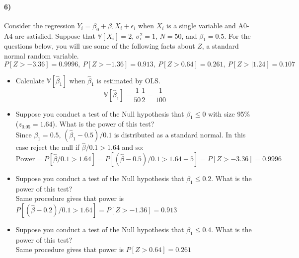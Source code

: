 \documentclass[12pt]{article}
\newcommand\BB{\mathbb}
\newcommand\h{\hat}
\newcommand\eps{\epsilon}
\numberwithin{equation}{section}
\numberwithin{figure}{section}
\numberwithin{table}{section}
\begin{document}
\paragraph{6)} Consider the regression $Y_i = \beta_0 + \beta_1X_i + \eps_i$ when $X_i$ is a single variable and A0-A4 are satisfied. Suppose that $\BB{V}[X_i] = 2$, $\sigma^2_\eps=1$, $N=50$, and $\beta_1 = 0.5$.
For the questions below, you will use some of the following facts about $Z$, a standard normal random variable.
\[P[Z>-3.36] = 0.9996,\ P[Z>-1.36] = 0.913, \ P[Z>0.64] = 0.261,\ P[Z>|1.24] = 0.107 \]
\begin{itemize}
\item Calculate $\BB{V}[\h{\beta}_1]$ when $\h{\beta}_1$ is estimated by OLS.
{\color{blue} \[\BB{V}[\h{\beta}_1] = \frac{1}{50}\frac{1}{2} = \frac{1}{100} \]}
\item Suppose you conduct a test of the Null hypothesis that $\beta_1\leq 0$ with size 95\% ($z_{0.05}=1.64$). What is the power of this test?\\
{\color{blue} Since $\beta_1=0.5$, $(\h{\beta}_1-0.5)/0.1$ is distributed as a standard normal. In this case reject the null if $\hat{\beta}/0.1>1.64$ and so:
\[\text{Power} = P[\hat{\beta}/0.1>1.64] = P[(\hat{\beta}-0.5)/0.1 > 1.64 - 5] = P[Z>-3.36] = 0.9996\]}
\item Suppose you conduct a test of the Null hypothesis that $\beta_1\leq 0.2$. What is the power of this test? \\
{\color{blue} Same procedure gives that power is $P[(\hat{\beta}-0.2)/0.1>1.64] = P[Z>-1.36] = 0.913$}
\item Suppose you conduct a test of the Null hypothesis that $\beta_1\leq 0.4$. What is the power of this test? \\
  {\color{blue} Same procedure gives that power is $P[Z>0.64] =0.261$}

\end{itemize}
\end{document}
